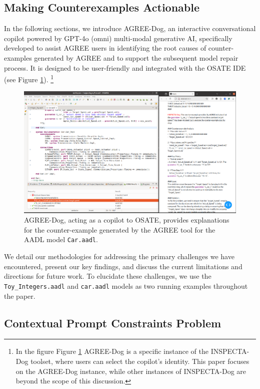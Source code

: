 \subsection{Making Counterexamples Actionable} 
In the following sections, we introduce AGREE-Dog, an interactive conversational copilot powered by GPT-4o (omni) multi-modal generative AI, specifically developed to assist AGREE users in identifying the root causes of counter-examples generated by AGREE and to support the subsequent model repair process. It is designed to be user-friendly and integrated with the OSATE IDE (see Figure \ref{fig:AGREEDOG}). \footnote{In the figure Figure \ref{fig:AGREEDOG} AGREE-Dog is a specific instance of the INSPECTA-Dog toolset, where users can select the copilot's identity. This paper focuses on the AGREE-Dog instance, while other instances of INSPECTA-Dog are beyond the scope of this discussion.}

\begin{figure}[htbp]  
    \centering
    \includegraphics[width=\textwidth]{AGREE-Dog.png}  
    \caption{AGREE-Dog, acting as a copilot to OSATE, provides explanations for the counter-example generated by the AGREE tool for the AADL model \texttt{Car.aadl}.}
    \label{fig:AGREEDOG}
\end{figure}


 We detail our methodologies for addressing the primary challenges we have encountered, present our key findings, and discuss the current limitations and directions for future work. To elucidate these challenges, we use the \texttt{Toy\_Integers.aadl} and \texttt{car.aadl} models as two running examples throughout the paper.

\subsection{Contextual Prompt Constraints Problem}

